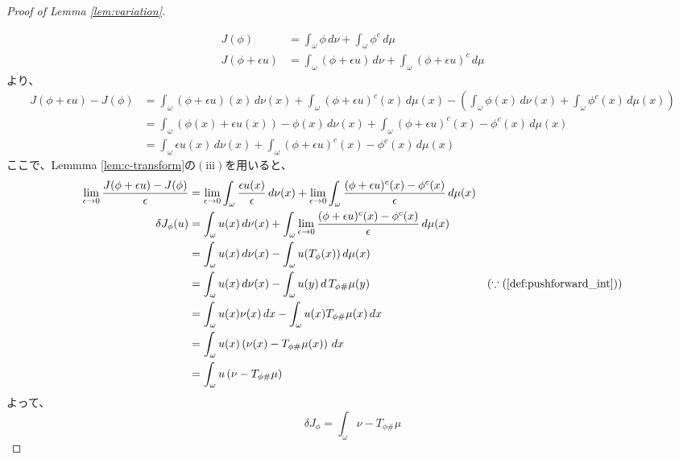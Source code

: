 \documentclass{jsarticle}
\theoremstyle{definition}
\begin{document}
\begin{proof}[Proof of Lemma \ref{lem:variation}]
  \hypertarget{proof:lem:variation}{}
  \begin{align*}
    J(\phi) &= \int_\omega \phi \, d\nu + \int_\omega \phi^c \, d\mu \\
    J(\phi + \epsilon u) &= \int_\omega (\phi + \epsilon u) \, d\nu + \int_\omega (\phi + \epsilon u)^c \, d\mu 
  \end{align*}
  より、
  \begin{align*}
    J(\phi + \epsilon u) - J(\phi)  &= \int_\omega (\phi + \epsilon u)(x) \, d\nu(x) + \int_\omega (\phi + \epsilon u)^c(x) \, d\mu(x) - \left( \int_\omega \phi(x) \, d\nu(x) + \int_\omega \phi^c(x) \, d\mu(x) \right)\\
                                    &= \int_\omega (\phi(x) + \epsilon u(x)) - \phi(x) \, d\nu(x) + \int_\omega (\phi + \epsilon u)^c(x) - \phi^c(x) \, d\mu(x) \\
                                    &= \int_\omega \epsilon u(x) \, d\nu(x) + \int_\omega (\phi + \epsilon u)^c(x) - \phi^c(x) \, d\mu(x) 
  \end{align*}
  ここで、Lemmma \ref{lem:c-transform}の$(\mathrm{iii})$を用いると、
  \begin{align*}
    \lim_{\epsilon \to 0} \frac{J(\phi + \epsilon u) - J(\phi)}{\epsilon} &= \lim_{\epsilon \to 0} \int_\omega \frac{ \epsilon u(x)}{\epsilon} \, d\nu(x) + \lim_{\epsilon \to 0} \int_\omega \frac{(\phi + \epsilon u)^c(x) - \phi^c(x)}{\epsilon} \, d\mu(x) \\
                                                        \delta J_\phi(u)  &= \int_\omega u(x) \, d\nu(x) + \int_\omega \lim_{\epsilon \to 0} \frac{(\phi + \epsilon u)^c(x) - \phi^c(x)}{\epsilon} \, d\mu(x) \\
                                                                          &= \int_\omega u(x) \, d\nu(x) - \int_\omega u(T_\phi(x)) \, d\mu(x) \\
                                                                          &= \int_\omega u(x) \, d\nu(x) - \int_\omega u(y) \, d\, T_{\phi \#} \mu(y) & (\because (\ref{def:pushforward_int}))\\
                                                                          &= \int_\omega u(x) \nu(x) \, dx - \int_\omega u(x) T_{\phi \#} \mu(x) \, dx\\
                                                                          &= \int_\omega u(x) \left(\nu(x) - T_{\phi \#} \mu(x) \right)\, dx\\
                                                                          &= \int_\omega u \left(\nu - T_{\phi \#} \mu \right)
  \end{align*}
  よって、
  \[
    \delta J_\phi = \int_\omega \nu - T_{\phi \#} \mu
  \]
\end{proof}
\end{document}

